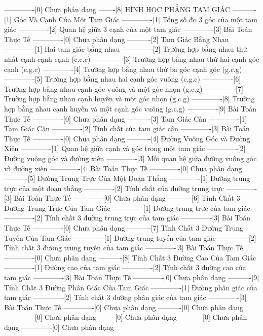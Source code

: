 -------------[0] Chưa phân dạng
-------[8] HÌNH HỌC PHẲNG TAM GIÁC
----------[1] Góc Và Cạnh Của Một Tam Giác
-------------[1] Tổng số đo 3 góc của một tam giác
-------------[2] Quan hệ giữa 3 cạnh của một tam giác
-------------[3] Bài Toán Thực Tế
-------------[0] Chưa phân dạng
----------[2] Tam Giác Bằng Nhau
-------------[1] Hai tam giác bằng nhau
-------------[2] Trường hợp bằng nhau thứ nhất cạnh cạnh cạnh (c.c.c)
-------------[3] Trường hợp bằng nhau thứ hai cạnh góc cạnh (c.g.c)
-------------[4] Trường hợp bằng nhau thứ ba góc cạnh góc (g.c.g)
-------------[5] Trường hợp bằng nhau hai cạnh góc vuông (c.g.c)
-------------[6] Trường hợp bằng nhau cạnh góc vuông và một góc nhọn (g.c.g)
-------------[7] Trường hợp bằng nhau cạnh huyền và một góc nhọn (g.c.g)
-------------[8] Trường hợp bằng nhau cạnh huyền và một cạnh góc vuông (g.c.g)
-------------[9] Bài Toán Thực Tế
-------------[0] Chưa phân dạng
----------[3] Tam Giác Cân
-------------[1] Tam Giác Cân
-------------[2] Tính chất của tam giác cân
-------------[3] Bài Toán Thực Tế
-------------[0] Chưa phân dạng
----------[4] Đường Vuông Góc và Đường Xiên
-------------[1] Quan hệ giữa cạnh và góc trong một tam giác
-------------[2] Đường vuông góc và đường xiên
-------------[3] Mối quan hệ giữa đường vuông góc và đường xiên
-------------[4] Bài Toán Thực Tế
-------------[0] Chưa phân dạng
----------[5] Đường Trung Trực Của Một Đoạn Thẳng
-------------[1] Đường trung trực của một đoạn thẳng
-------------[2] Tính chất của đường trung trực
-------------[3] Bài Toán Thực Tế
-------------[0] Chưa phân dạng
----------[6] Tính Chất 3 Đường Trung Trực Của Tam Giác
-------------[1] Đường trung trực của tam giác
-------------[2] Tính chất 3 đường trung trực của tam giác
-------------[3] Bài Toán Thực Tế
-------------[0] Chưa phân dạng
----------[7] Tính Chất 3 Đường Trung Tuyến Của Tam Giác
-------------[1] Đường trung tuyến của tam giác
-------------[2] Tính chất 3 đường trung tuyến của tam giác
-------------[3] Bài Toán Thực Tế
-------------[0] Chưa phân dạng
----------[8] Tính Chất 3 Đường Cao Của Tam Giác
-------------[1] Đường cao của tam giác
-------------[2] Tính chất 3 đường cao của tam giác
-------------[3] Bài Toán Thực Tế
-------------[0] Chưa phân dạng
----------[9] Tính Chất 3 Đường Phân Giác Của Tam Giác
-------------[1] Đường phân giác của tam giác
-------------[2] Tính chất 3 đường phân giác của tam giác
-------------[3] Bài Toán Thực Tế
-------------[0] Chưa phân dạng
----------[0] Chưa phân dạng
-------------[0] Chưa phân dạng
-------[0] Chưa phân dạng
----------[0] Chưa phân dạng
-------------[0] Chưa phân dạng
